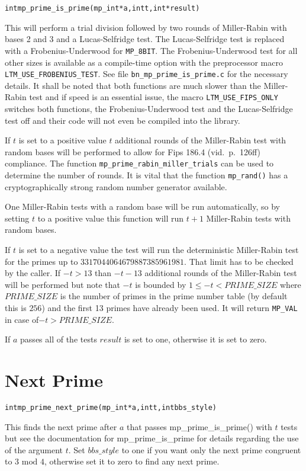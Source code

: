 \documentclass[synpaper]{book}
\begin{document}
\begin{alltt}
int mp_prime_is_prime (mp_int * a, int t, int *result)
\end{alltt}
This will perform a trial division followed by two rounds of Miller-Rabin with bases 2 and 3 and a Lucas-Selfridge test. The Lucas-Selfridge test is replaced with a Frobenius-Underwood for \texttt{MP\_8BIT}. The Frobenius-Underwood test for all other sizes is available as a compile-time option with the preprocessor macro \texttt{LTM\_USE\_FROBENIUS\_TEST}. See file
\texttt{bn\_mp\_prime\_is\_prime.c} for the necessary details. It shall be noted that both functions are much slower than
the Miller-Rabin test and if speed is an essential issue, the macro \texttt{LTM\_USE\_FIPS\_ONLY} switches both functions, the Frobenius-Underwood test and the Lucas-Selfridge test off and their code will not even be compiled into the library.

If $t$ is set to a positive value $t$ additional rounds of the Miller-Rabin test with random bases will be performed to allow for Fips 186.4 (vid.~p.~126ff) compliance. The function \texttt{mp\_prime\_rabin\_miller\_trials} can be used to determine the number of rounds. It is vital that the function \texttt{mp\_rand()} has a cryptographically strong random number generator available.

One Miller-Rabin tests with a random base will be run automatically, so by setting $t$ to a positive value this function will run $t + 1$ Miller-Rabin tests with random bases.

If  $t$ is set to a negative value the test will run the deterministic Miller-Rabin test for the primes up to
$3317044064679887385961981$. That limit has to be checked by the caller. If $-t > 13$ than $-t - 13$ additional rounds of the
Miller-Rabin test will be performed but note that $-t$ is bounded by $1 \le -t < PRIME\_SIZE$ where $PRIME\_SIZE$ is the number
of primes in the prime number table (by default this is $256$) and the first 13 primes have already been used. It will return
\texttt{MP\_VAL} in case of$-t > PRIME\_SIZE$.

If $a$ passes all of the tests $result$ is set to one, otherwise it is set to zero.

\section{Next Prime}
\begin{alltt}
int mp_prime_next_prime(mp_int *a, int t, int bbs_style)
\end{alltt}
This finds the next prime after $a$ that passes mp\_prime\_is\_prime() with $t$ tests but see the documentation for
mp\_prime\_is\_prime for details regarding the use of the argument $t$.  Set $bbs\_style$ to one if you
want only the next prime congruent to $3 \mbox{ mod } 4$, otherwise set it to zero to find any next prime.
\end{document}
